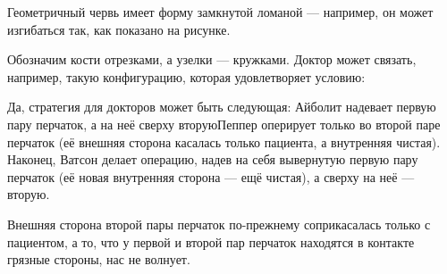 \begin{itemize}

\itA Геометричный червь имеет форму замкнутой ломаной — например, он может изгибаться так, как показано на рисунке.

\begin{center}  \end{center}

\itB Обозначим кости отрезками, а узелки — кружками. Доктор может связать, например, такую конфигурацию, которая удовлетворяет условию:

\begin{center}  \end{center}

\itC Да, стратегия для докторов может быть следующая: Айболит надевает первую пару перчаток, а на неё сверху вторую\scolon Пеппер оперирует только во второй паре перчаток (её внешняя сторона касалась только пациента, а внутренняя чистая). Наконец, Ватсон делает операцию, надев на себя вывернутую первую пару перчаток (её новая внутренняя сторона — ещё чистая), а сверху на неё — вторую.

Внешняя сторона второй пары перчаток по-прежнему соприкасалась только с пациентом, а то, что у первой и второй пар перчаток находятся в контакте грязные стороны, нас не волнует.
\end{itemize}
